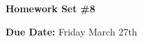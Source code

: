 


\thispagestyle{fancy}






\begin{center}
{\huge \textbf{Homework Set \#8 }}
\large

{\textbf{ Due Date:} Friday March 27th  } 
\end{center}

